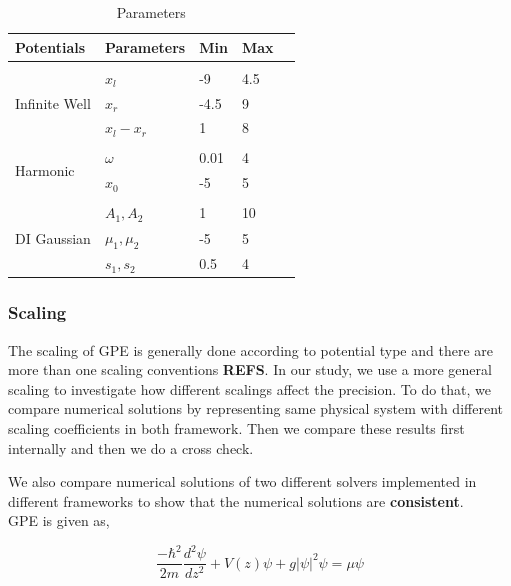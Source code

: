 \documentclass[a4paper,times,12pt]{article}
\begin{document}
\begin{table}[H]
\centering
\caption{Parameters}
\label{tb:analytic_pot_params}
    \begin{tabular}{l|llll}
    Potentials                     & Parameters     & Min  & Max & \\  \hline \\
    \multirow{3}{*}{Infinite Well} & $x_l$          & -9   & 4.5 & \\
                                   & $x_r$          & -4.5 & 9   & \\
                                   & $x_l - x_r$    & 1    & 8   & \\ \hline \\
    \multirow{2}{*}{Harmonic}      & $\omega$       & 0.01 & 4   & \\
                                   & $x_0$          & -5   & 5   & \\ \hline \\
    \multirow{3}{*}{DI Gaussian}   & $A_1, A_2$     & 1    & 10  & \\
                                   & $\mu_1, \mu_2$ & -5   & 5   & \\
                                   & $s_1, s_2$     & 0.5  & 4   & 
    \end{tabular}
\end{table}






\subsubsection{Scaling}

The scaling of GPE is generally done according to potential type and there are more than one scaling conventions \textbf{REFS}. In our study, we use a more general scaling to investigate how different scalings affect the precision. To do that, we compare numerical solutions by representing same physical system with different scaling coefficients in both framework. Then we compare these results first internally and then we do a cross check. 

We also compare numerical solutions of two different solvers implemented in different frameworks to show that the numerical solutions are \textbf{consistent}.\\ 

GPE is given as,

\begin{equation}
    \label{eq:GPE_1D}
    \frac{-\hbar^2}{2m}\frac{d^2\psi}{dz^2} + V(z)\psi + g|\psi|^2\psi = \mu\psi
\end{equation}
\end{document}

